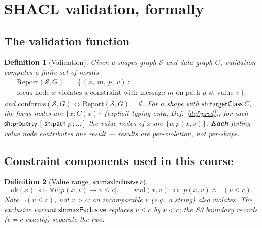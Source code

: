 \documentclass[11pt,a4paper]{article}
\newtheorem{definition}{Definition}[section]
\newcommand{\IRI}[1]{\textsf{#1}}                    %
\newcommand{\graph}{G}
\newcommand{\shapes}{\mathcal{S}}
\newcommand{\vio}{\mathrm{viol}}
\begin{document}
\section{SHACL validation, formally}\label{sec:shacl}

\subsection{The validation function}

\begin{definition}[Validation]\label{def:validation}
Given a shapes graph $\shapes$ and data graph $\graph$, validation computes a
finite set of \emph{results}
\begin{multline*}
  \mathrm{Report}(\shapes, \graph) \;=\;
  \{\, (x,\ m,\ p,\ v)\ : \\
  \text{focus node } x \text{ violates a constraint with
  message } m \text{ on path } p \text{ at value } v \,\},
\end{multline*}
and $\mathrm{conforms}(\shapes,\graph) \Leftrightarrow
\mathrm{Report}(\shapes,\graph) = \emptyset$. For a shape with
$\IRI{sh{:}targetClass}\ C$, the focus nodes are $\{x : C(x)\}$ (explicit typing
only, Def.~\ref{def:pred}); for each
$\IRI{sh{:}property}\,[\,\IRI{sh{:}path}\ p\,;\ldots]$ the \emph{value nodes} of
$x$ are $\{v : p(x,v)\}$. \textbf{Each} failing value node contributes one
result --- results are per-violation, not per-shape.
\end{definition}

\subsection{Constraint components used in this course}

\begin{definition}[Value range, $\IRI{sh{:}maxInclusive}\ c$]\label{def:maxinc}
\[
  \mathrm{ok}(x) \;\Longleftrightarrow\; \forall v\, \bigl[p(x,v) \rightarrow v \le c\bigr],
  \qquad
  \vio(x,v) \;\Longleftrightarrow\; p(x,v) \wedge \neg (v \le c).
\]
Note $\neg(v \le c)$, not $v > c$: an incomparable $v$ (e.g.\ a string) also
violates. The exclusive variant $\IRI{sh{:}maxExclusive}$ replaces $v \le c$ by
$v < c$; the S3 boundary records ($v = c$ exactly) separate the two.
\end{definition}
\end{document}
